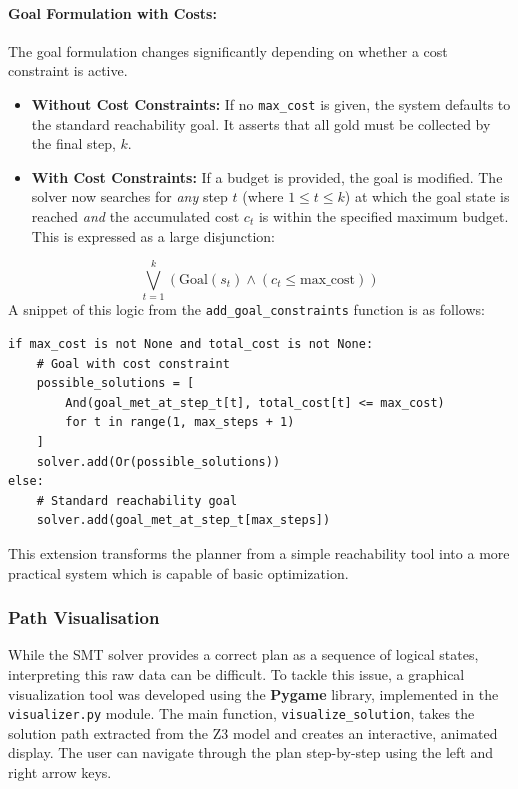\documentclass[12pt, a4paper, oneside]{report} %
\begin{document}
\paragraph{Goal Formulation with Costs:}
The goal formulation changes significantly depending on whether a cost constraint is active.
\begin{itemize}
    \item \textbf{Without Cost Constraints:} If no \texttt{max\_cost} is given, the system defaults to the standard reachability goal. It asserts that all gold must be collected by the final step, $k$.
    \item \textbf{With Cost Constraints:} If a budget is provided, the goal is modified. The solver now searches for \textit{any} step $t$ (where $1 \le t \le k$) at which the goal state is reached \textit{and} the accumulated cost $c_t$ is within the specified maximum budget. This is expressed as a large disjunction:
\end{itemize}
$$ \bigvee_{t=1}^{k} (\text{Goal}(s_t) \land (c_t \le \text{max\_cost})) $$
A snippet of this logic from the \texttt{add\_goal\_constraints} function is as follows:
\begin{verbatim}
if max_cost is not None and total_cost is not None:
    # Goal with cost constraint
    possible_solutions = [
        And(goal_met_at_step_t[t], total_cost[t] <= max_cost)
        for t in range(1, max_steps + 1)
    ]
    solver.add(Or(possible_solutions))
else:
    # Standard reachability goal
    solver.add(goal_met_at_step_t[max_steps])
\end{verbatim}
This extension transforms the planner from a simple reachability 
tool into a more practical system which is capable of basic optimization.
\subsubsection{Path Visualisation}
While the SMT solver provides a correct plan as a sequence of logical states, interpreting this raw data can be difficult. To tackle this issue, a graphical visualization tool was developed using the \textbf{Pygame} library, implemented in the \texttt{visualizer.py} module. The main function, \texttt{visualize\_solution}, takes the solution path extracted from the Z3 model and creates an interactive, animated display. The user can navigate through the plan step-by-step using the left and right arrow keys.
\end{document}
